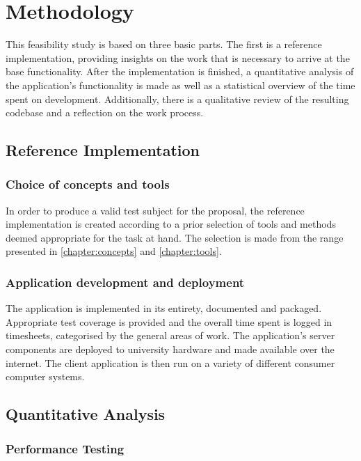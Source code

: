\chapter{Methodology}
\label{chapter:methodology}

This feasibility study is based on three basic parts. The first is a reference implementation, providing insights on the work that is necessary to arrive at the base functionality. After the implementation is finished, a quantitative analysis of the application's functionality is made as well as a statistical overview of the time spent on development. Additionally, there is a qualitative review of the resulting codebase and a reflection on the work process.

\section{Reference Implementation}

\subsection{Choice of concepts and tools}

In order to produce a valid test subject for the proposal, the reference implementation is created according to a prior selection of tools and methods deemed appropriate for the task at hand. The selection is made from the range presented in \autoref{chapter:concepts} and \autoref{chapter:tools}.

\subsection{Application development and deployment}

The application is implemented in its entirety, documented and packaged. Appropriate test coverage is provided and the overall time spent is logged in timesheets, categorised by the general areas of work. The application's server components are deployed to university hardware and made available over the internet. The client application is then run on a variety of different consumer computer systems.

\section{Quantitative Analysis}

\subsection{Performance Testing}

